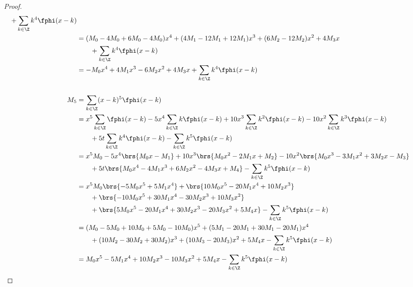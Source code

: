 \begin{proof}
\begin{align*}
      +  \sum_{k\in\Z} k^4 \fphi(x-k)
  \\&= (M_0- 4M_0+6M_0- 4M_0)x^4
      + (4M_1- 12M_1+ 12M_1)x^3
      + (6M_2-12M_2)x^2
      + 4M_3x
      \\&\qquad+ \sum_{k\in\Z} k^4 \fphi(x-k)
  \\&= -M_0x^4
      + 4M_1x^3
      - 6M_2x^2
      + 4M_3x
      + \sum_{k\in\Z} k^4 \fphi(x-k)
  \\
  \\
  M_5
    &= \sum_{k\in\Z} (x-k)^5  \fphi(x-k)
  \\&=  x^5 \sum_{k\in\Z}     \fphi(x-k)
      - 5x^4 \sum_{k\in\Z} k   \fphi(x-k)
      +10x^3 \sum_{k\in\Z} k^2 \fphi(x-k)
      -10x^2 \sum_{k\in\Z} k^3 \fphi(x-k)
      \\&\qquad+ 5t   \sum_{k\in\Z} k^4 \fphi(x-k)
      -      \sum_{k\in\Z} k^5 \fphi(x-k)
  \\&=  x^5 M_0
      - 5x^4 \brs{ M_0x-M_1                 }
      +10x^3 \brs{ M_0x^2-2M_1x+M_2         }
      -10x^2 \brs{ M_0x^3-3M_1x^2+3M_2x-M_3 }
      \\&\qquad+ 5t   \brs{ M_0x^4-4M_1x^3+6M_2x^2-4M_3x+M_4 }
      -      \sum_{k\in\Z} k^5 \fphi(x-k)
  \\&=  x^5 M_0
      \brs{ -5M_0x^5+5M_1x^4                 }
      + \brs{ 10M_0x^5 -20M_1x^4 + 10M_2x^3  }
      \\&\qquad+ \brs{ -10M_0x^5 +30M_1x^4 -30M_2x^3 +10M_3x^2 }
      \\&\qquad+ \brs{ 5M_0x^5 - 20M_1x^4 +30M_2x^3 - 20M_3x^2 +5M_4x }
      - \sum_{k\in\Z} k^5 \fphi(x-k)
  \\&= (M_0-5M_0+10M_0+5M_0-10M_0)x^5
       +(5M_1-20M_1+30M_1-20M_1)x^4
       \\&\qquad+(10M_2-30M_2+30M_2)x^3
       +(10M_3-20M_3)x^2
       + 5M_4x
      - \sum_{k\in\Z} k^5 \fphi(x-k)
  \\&= M_0x^5 - 5M_1x^4 + 10M_2x^3 - 10M_3x^2 + 5M_4x
      - \sum_{k\in\Z} k^5 \fphi(x-k)
\end{align*}


\end{proof}
